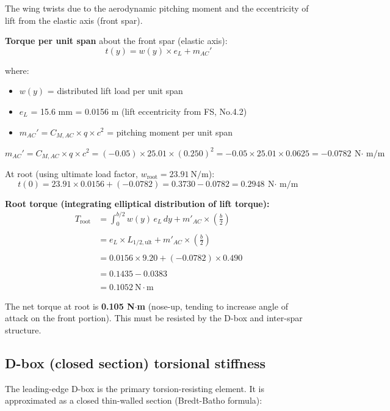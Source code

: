 \documentclass[10pt,a4paper]{article}
\begin{document}
The wing twists due to the aerodynamic pitching moment and the eccentricity of lift from the elastic axis (front spar).

\textbf{Torque per unit span} about the front spar (elastic axis):
\[
t(y) = w(y) \times e_L + m_{AC}'
\]

where:
\begin{itemize}[noitemsep,topsep=2pt]
\item $w(y)$ = distributed lift load per unit span
\item $e_L$ = 15.6 mm = 0.0156 m (lift eccentricity from FS, No.4.2)
\item $m_{AC}' = C_{M,AC} \times q \times c^2$ = pitching moment per unit span
\end{itemize}

\[
m_{AC}' = C_{M,AC} \times q \times c^2 = (-0.05) \times 25.01 \times (0.250)^2 = -0.05 \times 25.01 \times 0.0625 = -0.0782\ \text{N$\cdot$ m/m}
\]

At root (using ultimate load factor, $w_{\text{root}} = 23.91\ \text{N/m}$):
\[
t(0) = 23.91 \times 0.0156 + (-0.0782) = 0.3730 - 0.0782 = 0.2948\ \text{N$\cdot$ m/m}
\]

\textbf{Root torque (integrating elliptical distribution of lift torque):}
\begin{align*}
T_{\text{root}} 
&= \int_0^{b/2} w(y)\, e_L \, dy + m'_{AC} \times \left(\frac{b}{2}\right) \\
\\
&= e_L \times L_{1/2,\text{ult}} + m'_{AC} \times \left(\frac{b}{2}\right) \\
\\
&= 0.0156 \times 9.20 + (-0.0782) \times 0.490 \\
\\
&= 0.1435 - 0.0383 \\
\\
&= 0.1052\ \text{N}\cdot\text{m}
\end{align*}

The net torque at root is \textbf{0.105 N${\cdot}$m} (nose-up, tending to increase angle of attack on the front portion). This must be resisted by the D-box and inter-spar structure.


\subsection{D-box (closed section) torsional stiffness}


The leading-edge D-box is the primary torsion-resisting element. It is approximated as a closed thin-walled section (Bredt-Batho formula):
\end{document}
